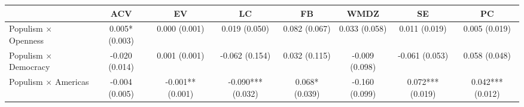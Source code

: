 \begin{tabular}{lccccccc}
\toprule
 & ACV & EV & LC & FB & WMDZ & SE & PC \\
\midrule
Populism $\times$ Openness & 0.005* (0.003) & 0.000 (0.001) & 0.019 (0.050) & 0.082 (0.067) & 0.033 (0.058) & 0.011 (0.019) & 0.005 (0.019) \\
Populism $\times$ Democracy & -0.020 (0.014) & 0.001 (0.001) & -0.062 (0.154) & 0.032 (0.115) & -0.009 (0.098) & -0.061 (0.053) & 0.058 (0.048) \\
Populism $\times$ Americas & -0.004 (0.005) & -0.001** (0.001) & -0.090*** (0.032) & 0.068* (0.039) & -0.160 (0.099) & 0.072*** (0.019) & 0.042*** (0.012) \\
\bottomrule
\end{tabular}
